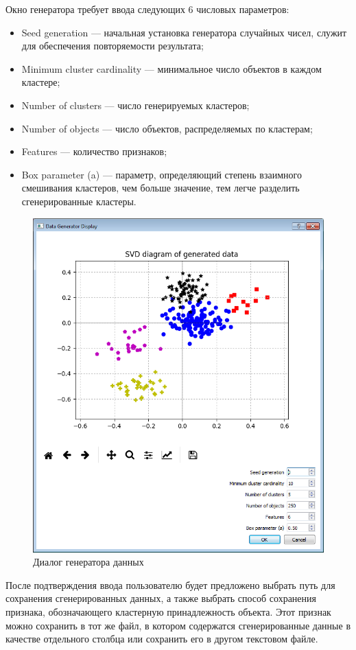 \documentclass[12pt]{diploma}
\begin{document}
	Окно генератора требует ввода следующих 6 числовых параметров:
	\begin{itemize}
		\item Seed generation --- начальная установка генератора случайных чисел, служит для обеспечения повторяемости результата;
		\item Minimum cluster cardinality --- минимальное число объектов в каждом кластере;
		\item Number of clusters --- число генерируемых кластеров;
		\item Number of objects --- число объектов, распределяемых по кластерам;
		\item Features --- количество признаков;
		\item Box parameter (a) --- параметр, определяющий степень взаимного смешивания кластеров, чем больше значение, тем легче разделить сгенерированные кластеры.
	\end{itemize}
	
	\begin{figure}[h!]
		\centering
		\includegraphics[width=0.7\linewidth]{img/instruction/gen-data-dialog}
		\caption{Диалог генератора данных}
		\label{fig:generator-dialog}
	\end{figure}
	
	После подтверждения ввода пользователю будет предложено выбрать путь для сохранения сгенерированных данных, а также выбрать способ сохранения признака, обозначающего кластерную принадлежность объекта. Этот признак можно сохранить в тот же файл, в котором содержатся сгенерированные данные в качестве отдельного столбца или сохранить его в другом текстовом файле.
	
\end{document}
